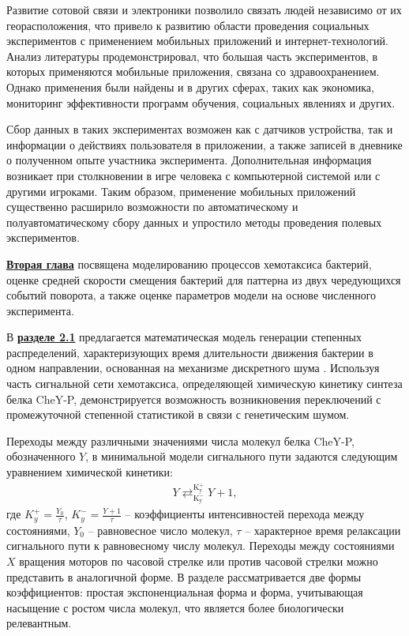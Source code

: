 Развитие сотовой связи и электроники позволило связать людей независимо от их георасположения, что привело к развитию области проведения социальных экспериментов с применением мобильных приложений и интернет-технологий. Анализ литературы продемонстрировал, что большая часть экспериментов, в которых применяются мобильные приложения, связана со здравоохранением. Однако применения были найдены и в других сферах, таких как экономика, мониторинг эффективности программ обучения, социальных явлениях и других. 

Сбор данных в таких экспериментах возможен как с датчиков устройства, так и информации о действиях пользователя в приложении, а также записей в дневнике о полученном опыте участника эксперимента. Дополнительная информация возникает при столкновении в игре человека с компьютерной системой или с другими игроками. Таким образом, применение мобильных приложений существенно расширило возможности по автоматическому и полуавтоматическому сбору данных и упростило методы проведения полевых экспериментов.

\underline{\textbf{Вторая глава}} посвящена моделированию процессов хемотаксиса бактерий, оценке средней скорости смещения бактерий для паттерна из двух чередующихся событий поворота, а также оценке параметров модели на основе численного эксперимента.

В \underline{\textbf{разделе 2.1}} предлагается математическая модель генерации степенных распределений, характеризующих время длительности движения бактерии в одном направлении, основанная на механизме дискретного шума \cite{bib1,confbib5}. Используя часть сигнальной сети хемотаксиса, определяющей химическую кинетику синтеза белка CheY-P, демонстрируется возможность возникновения переключений с промежуточной степенной статистикой в связи с генетическим шумом.

Переходы между различными значениями числа молекул белка CheY-P, обозначенного $Y$, в минимальной модели сигнального пути задаются следующим уравнением химической кинетики:
\begin{equation}
    \begin{aligned}
        Y \mathrel{\mathop{\rightleftarrows}^{\mathrm{K_{y}^{+}}}_{\mathrm{K_{y}^{-}}}} Y + 1,
    \label{eq:chem}
    \end{aligned}
\end{equation}
где $K_{y}^{+}=\frac{Y_0}{\tau}$, $K_{y}^{-}=\frac{Y+1}{\tau}$ -- коэффициенты интенсивностей перехода между состояниями, $Y_0$ -- равновесное число молекул, $\tau$ -- характерное время релаксации сигнального пути к равновесному числу молекул. Переходы между состояниями $X$ вращения моторов по часовой стрелке или против часовой стрелки можно представить в аналогичной форме. В разделе рассматривается две формы коэффициентов: простая экспоненциальная форма и форма, учитывающая насыщение с ростом числа молекул, что является более биологически релевантным.

